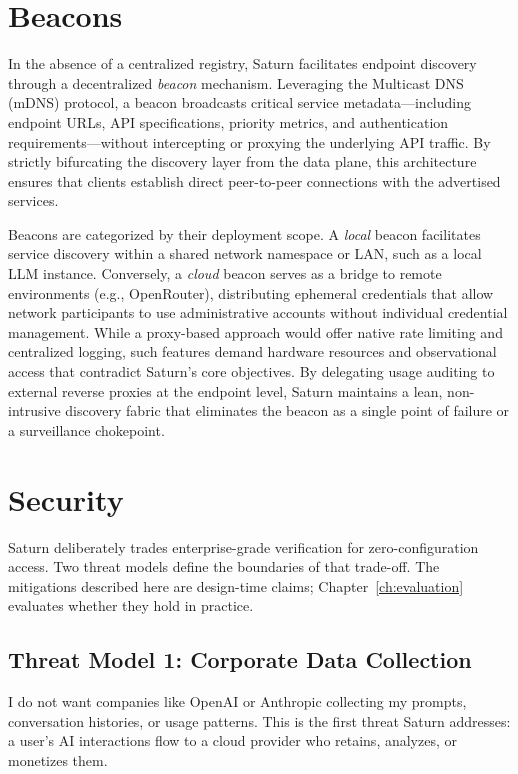 \section{Beacons}
\label{sec:beacon-architecture}

In the absence of a centralized registry, Saturn facilitates endpoint discovery through a decentralized \emph{beacon} mechanism. Leveraging the Multicast DNS (mDNS) protocol, a beacon broadcasts critical service metadata—including endpoint URLs, API specifications, priority metrics, and authentication requirements—without intercepting or proxying the underlying API traffic. By strictly bifurcating the discovery layer from the data plane, this architecture ensures that clients establish direct peer-to-peer connections with the advertised services.

Beacons are categorized by their deployment scope. A \emph{local} beacon facilitates service discovery within a shared network namespace or LAN, such as a local LLM instance. Conversely, a \emph{cloud} beacon serves as a bridge to remote environments (e.g., OpenRouter), distributing ephemeral credentials that allow network participants to use administrative accounts without individual credential management. While a proxy-based approach would offer native rate limiting and centralized logging, such features demand hardware resources and observational access that contradict Saturn's core objectives. By delegating usage auditing to external reverse proxies at the endpoint level, Saturn maintains a lean, non-intrusive discovery fabric that eliminates the beacon as a single point of failure or a surveillance chokepoint.

\section{Security}
\label{sec:security}

Saturn deliberately trades enterprise-grade verification for zero-configuration access. Two threat models define the boundaries of that trade-off. The mitigations described here are design-time claims; Chapter~\ref{ch:evaluation} evaluates whether they hold in practice.

\subsection{Threat Model 1: Corporate Data Collection}
\label{sec:threat-corporate}

I do not want companies like OpenAI or Anthropic collecting my prompts, conversation histories, or usage patterns. This is the first threat Saturn addresses: a user's AI interactions flow to a cloud provider who retains, analyzes, or monetizes them.

